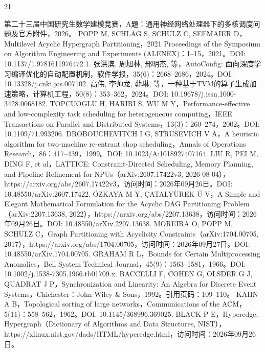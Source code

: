 \documentclass[anonymous,withtoc]{gmcm2026}
\begin{document}
\FloatBarrier
{}\begin{thebibliography}{21}
\raggedright
{} 第二十三届中国研究生数学建模竞赛，A题：通用神经网络处理器下的多核调度问题及官方附件，2026。
 POPP M, SCHLAG S, SCHULZ C, SEEMAIER D，Multilevel Acyclic Hypergraph Partitioning，2021 Proceedings of the Symposium on Algorithm Engineering and Experiments (ALENEX)：1--15，2021。DOI: 10.1137/1.9781611976472.1.
 张洪滨, 周旭林, 邢明杰, 等，AutoConfig: 面向深度学习编译优化的自动配置机制，软件学报，35(6)：2668--2686，2024。DOI: 10.13328/j.cnki.jos.007102.
 高伟, 李帅龙, 茆琳, 等，一种基于TVM的算子生成加速策略，计算机工程，50(8)：353--362，2024。DOI: 10.19678/j.issn.1000-3428.0068182.
 TOPCUOGLU H, HARIRI S, WU M Y，Performance-effective and low-complexity task scheduling for heterogeneous computing，IEEE Transactions on Parallel and Distributed Systems，13(3)：260--274，2002。DOI: 10.1109/71.993206.
 DROBOUCHEVITCH I G, STRUSEVICH V A，A heuristic algorithm for two-machine re-entrant shop scheduling，Annals of Operations Research，86：417--439，1999。DOI: 10.1023/A:1018927407164.
 LIU R, PEI M, DING F, et al，LATTICE: Constraint-Directed Scheduling, Memory Planning, and Pipeline Refinement for NPUs（arXiv:2607.17422v3, 2026-08-04），https://arxiv.org/abs/2607.17422v3，访问时间：2026年09月26日。DOI: 10.48550/arXiv.2607.17422.
 ÖZKAYA M Y, ÇATALYÜREK Ü V，A Simple and Elegant Mathematical Formulation for the Acyclic DAG Partitioning Problem（arXiv:2207.13638, 2022），https://arxiv.org/abs/2207.13638，访问时间：2026年09月26日。DOI: 10.48550/arXiv.2207.13638.
 MOREIRA O, POPP M, SCHULZ C，Graph Partitioning with Acyclicity Constraints（arXiv:1704.00705, 2017），https://arxiv.org/abs/1704.00705，访问时间：2026年09月27日。DOI: 10.48550/arXiv.1704.00705.
 GRAHAM R L，Bounds for Certain Multiprocessing Anomalies，Bell System Technical Journal，45(9)：1563--1581，1966。DOI: 10.1002/j.1538-7305.1966.tb01709.x.
 BACCELLI F, COHEN G, OLSDER G J, QUADRAT J P，Synchronization and Linearity: An Algebra for Discrete Event Systems，Chichester：John Wiley \& Sons，1992。引用页码：109--110。
 KAHN A B，Topological sorting of large networks，Communications of the ACM，5(11)：558--562，1962。DOI: 10.1145/368996.369025.
 BLACK P E，Hyperedge; Hypergraph（Dictionary of Algorithms and Data Structures, NIST），https://xlinux.nist.gov/dads/HTML/hyperedge.html，访问时间：2026年09月26日。

\end{thebibliography}
\end{document}

